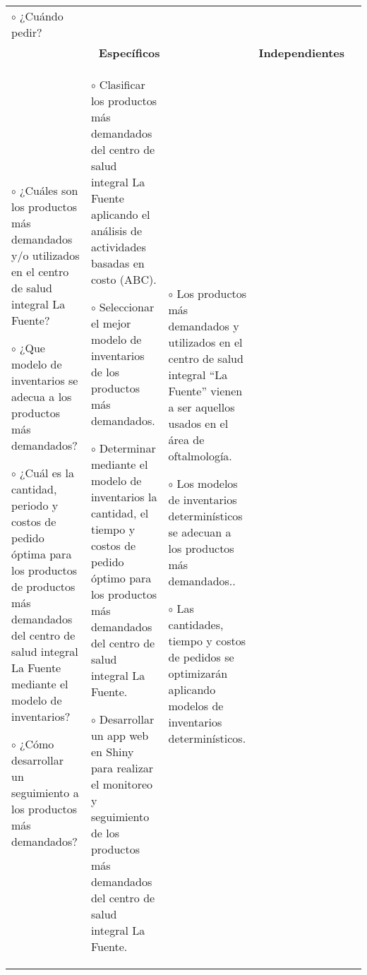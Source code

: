 \begin{matriz_consistencia}
\begin{landscape}
\begin{table}[h!]
\begin{tabular}{|p{4.2cm}|p{4.2cm}|p{4.2cm}|p{4.2cm}|p{4.2cm}|}
    $\circ$ ¿Cuándo pedir?\vspace{0.2cm}
  &                       \\ \cline{1-4}
\multicolumn{3}{|c|}{\textbf{Específicos}}                               & \textbf{Independientes} &  \\ \cline{1-4}
\multicolumn{1}{|p{4.2cm}|}{
    $\circ$ ¿Cuáles son los productos más demandados y/o utilizados en el centro de salud integral La Fuente?\vspace{0.2cm}

    $\circ$ ¿Que modelo de inventarios se adecua a los productos más demandados?\vspace{0.2cm}

    $\circ$ ¿Cuál es la cantidad, periodo y costos de pedido óptima para los productos de productos más demandados del centro de salud integral La Fuente mediante el modelo de inventarios?\vspace{0.2cm}

    $\circ$ ¿Cómo desarrollar un seguimiento a los productos más demandados?} & \multicolumn{1}{p{4.2cm}|}{
    $\circ$ Clasificar los productos más demandados del centro de salud integral La Fuente aplicando el análisis de actividades basadas en costo (ABC).\vspace{0.2cm}

    $\circ$ Seleccionar el mejor modelo de inventarios de los productos más demandados.\vspace{0.2cm}

    $\circ$ Determinar mediante el modelo de inventarios la cantidad, el tiempo y costos de pedido óptimo para los productos más demandados del centro de salud integral La Fuente.\vspace{0.2cm}

    $\circ$ Desarrollar un app web en Shiny para realizar el monitoreo y seguimiento de los productos más demandados del centro de salud integral La Fuente.

    } & \multicolumn{1}{p{4.2cm}|}{
    $\circ$ Los productos más demandados y utilizados en el centro de salud integral ``La Fuente'' vienen a ser aquellos usados en el área de oftalmología.\vspace{0.2cm}

    $\circ$ Los modelos de inventarios determinísticos se adecuan a los productos más demandados..\vspace{0.2cm}

    $\circ$ Las cantidades, tiempo y costos de pedidos se optimizarán aplicando modelos de inventarios determinísticos.\vspace{0.2cm}

}
\end{tabular}
\end{table}
\end{landscape}
\end{matriz_consistencia}
